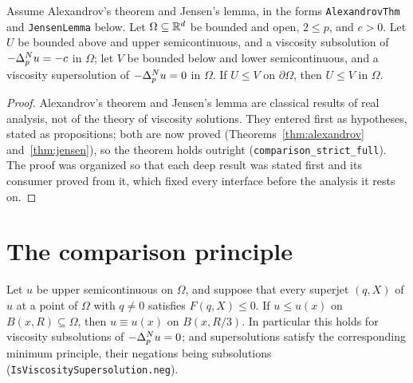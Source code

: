\begin{theorem}\label{thm:strictcomp}
\leanok
{}
Assume Alexandrov's theorem and Jensen's lemma, in the forms
\texttt{AlexandrovThm} and \texttt{JensenLemma} below. Let
$\Omega \subseteq \mathbb{R}^d$ be bounded and open, $2 \le p$, and $c > 0$. Let $U$ be
bounded above and upper semicontinuous, and a viscosity subsolution of
$-\Delta_p^{N} u = -c$ in $\Omega$; let $V$ be bounded below and lower semicontinuous,
and a viscosity supersolution of $-\Delta_p^{N} u = 0$ in $\Omega$. If $U \le V$ on
$\partial\Omega$, then $U \le V$ in $\Omega$.
\end{theorem}

\begin{proof}
\leanok
{}
Alexandrov's theorem and Jensen's lemma are classical results of real analysis,
not of the theory of viscosity solutions. They entered first as hypotheses,
stated as propositions; both are now proved
(Theorems~\ref{thm:alexandrov} and~\ref{thm:jensen}), so the theorem holds
outright (\texttt{comparison\_strict\_full}). The proof was organized
so that each deep result was stated first and its consumer proved from it,
which fixed every interface before the analysis it rests on.
\end{proof}


\chapter{The comparison principle}

\begin{theorem}\label{thm:smp}
\leanok
{}
Let $u$ be upper semicontinuous on $\Omega$, and suppose that every superjet
$(q, X)$ of $u$ at a point of $\Omega$ with $q \ne 0$ satisfies
$F(q, X) \le 0$. If $u \le u(x)$ on $B(x, R) \subseteq \Omega$, then
$u \equiv u(x)$ on $B(x, R/3)$. In particular this holds for viscosity
subsolutions of $-\Delta_p^{N} u = 0$; and supersolutions satisfy the corresponding
minimum principle, their negations being subsolutions
(\texttt{IsViscositySupersolution.neg}).
\end{theorem}

